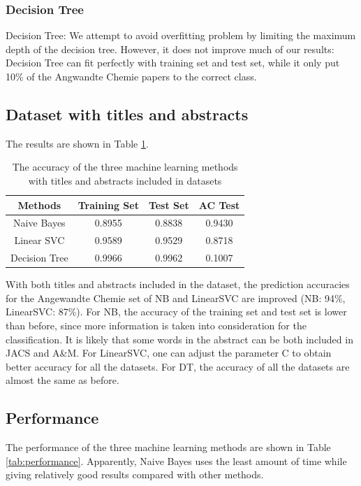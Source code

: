 \documentclass[conference]{IEEEtran}
\begin{document}
\subsubsection{Decision Tree}
Decision Tree: We attempt to avoid overfitting problem by limiting the maximum depth of the decision tree. However, it does not improve much of our results: Decision Tree can fit perfectly with training set and test set, while it only put 10\% of the Angwandte Chemie papers to the correct class.

\subsection{Dataset with titles and abstracts}

The results are shown in Table \ref{tab:acc-abs}.

\begin{table}
    \caption{The accuracy of the three machine learning methods with titles and abstracts included in datasets\label{tab:acc-abs}}
    \begin{center}
        \begin{tabular}{c | c | c | c}
            \hline
            \bf{Methods} & \bf{Training Set} & \bf{Test Set} & \bf{AC Test} \\
            \hline
            Naive Bayes & 0.8955 & 0.8838 & 0.9430 \\
            \hline
            Linear SVC & 0.9589 & 0.9529 & 0.8718 \\
            \hline
            Decision Tree & 0.9966 & 0.9962 & 0.1007 \\
            \hline
        \end{tabular}
    \end{center}
\end{table}

With both titles and abstracts included in the dataset, the prediction accuracies for the Angewandte Chemie set of NB and LinearSVC are improved (NB: 94\%, LinearSVC: 87\%). For NB, the accuracy of the training set and test set is lower than before, since more information is taken into consideration for the classification. It is likely that some words in the abstract can be both included in JACS and A\&M. For LinearSVC, one can adjust the parameter C to obtain better accuracy for all the datasets. For DT, the accuracy of all the datasets are almost the same as before.

\subsection{Performance}
The performance of the three machine learning methods are shown in Table \ref{tab:performance}. Apparently, Naive Bayes uses the least amount of time while giving relatively good results compared with other methods.
\end{document}
